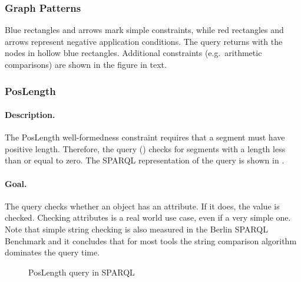 \subsubsection{Graph Patterns}

Blue rectangles and arrows mark simple constraints, while red rectangles and arrows represent negative application conditions. The query returns with the nodes in hollow blue rectangles. Additional constraints (e.g.\ arithmetic comparisons) are shown in the figure in text.


\subsubsection{PosLength}

\paragraph{Description.} The \textsf{PosLength} well-formedness constraint requires that a segment must have positive length. Therefore, the query () checks for segments with a length less than or equal to zero. The SPARQL representation of the query is shown in .

\paragraph{Goal.} The query checks whether an object has an attribute. If it does, the value is checked. Checking attributes is a real world use case, even if a very simple one. Note that simple string checking is also measured in the Berlin SPARQL Benchmark \cite{BSBM} and it concludes that for most tools the string comparison algorithm dominates the query time.

\begin{figure}[Htb]
\centering
\begin{minipage}{0.5\textwidth}
  { \alignListing
    }
  \caption{\textsf{PosLength} query in SPARQL}
  \label{lst:poslength-sparql}
\end{minipage}
\end{figure}

% 
% 
% 
% 

